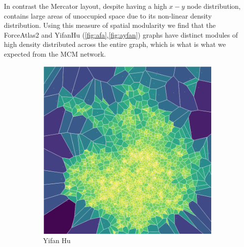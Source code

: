In contrast the Mercator layout, despite having a high $x-y$ node distribution, contains large areas of unoccupied space due to its non-linear density distribution. Using this measure of spatial modularity we find that the ForceAtlas2 and YifanHu (\autoref{fig:afa},\autoref{fig:ayfan}) graphs have distinct modules of high density distributed across the entire graph, which is what is what we expected from the MCM network.



\begin{figure}[H]
     \centering
    \begin{subfigure}[b]{.45\textwidth}
         \centering \includegraphics[width=\textwidth,angle=90]{figures_c1/area/fill_yfan_aphh.png}
         \caption{Yifan Hu}
         \label{fig:ayfan}
     \end{subfigure}
     \begin{subfigure}[b]{.45\textwidth}

\end{subfigure}
\end{figure}
